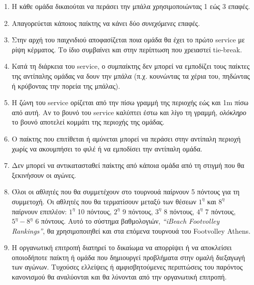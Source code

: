 \documentclass[a4paper,11pt]{article}
\begin{document}
\begin{enumerate}
\item Η κάθε ομάδα δικαιούται να περάσει την μπάλα χρησιμοποιώντας 1 εώς 3
  επαφές.

\item Απαγορεύεται κάποιος παίκτης να κάνει δύο \textit{συνεχόμενες} επαφές.

\item Στην αρχή του παιχνιδιού αποφασίζεται ποια ομάδα θα έχει το πρώτο service
  με ρίψη κέρματος. Το ίδιο συμβαίνει και στην περίπτωση που χρειαστεί
  tie-break.

\item Κατά τη διάρκεια του service, ο συμπαίκτης δεν μπορεί να εμποδίζει τους
  παίκτες της αντίπαλης ομάδας να δουν την μπάλα (π.χ. κουνώντας τα χέρια του,
  πηδώντας ή κρύβοντας την πορεία της μπάλας).

\item Η ζώνη του service ορίζεται από την πίσω γραμμή της περιοχής εώς και 1m
  πίσω από αυτή. Αν το βουνό του service καλύπτει έστω και λίγο τη γραμμή,
  \textit{ολόκληρο} το βουνό αποτελεί κομμάτι της περιοχής της ομάδας.

\item Ο παίκτης που επιτίθεται ή αμύνεται μπορεί να περάσει στην αντίπαλη
  περιοχή χωρίς να ακουμπήσει το φιλέ ή να εμποδίσει την αντίπαλη ομάδα.

\item Δεν μπορεί να αντικατασταθεί παίκτης από κάποια ομάδα από τη στιγμή που θα
  ξεκινήσουν οι αγώνες.

\item Όλοι οι αθλητές που θα συμμετέχουν στο τουρνουά παίρνουν 5 πόντους για τη
  συμμετοχή. Οι αθλητές που θα τερματίσουν μεταξύ των θέσεων $1^{\eta}$ και
  $8^{\eta}$ παίρνουν επιπλέον: $1^{\eta}$ 10 πόντους, $2^{\eta}$ 9 πόντους,
  $3^{\eta}$ 8 πόντους, $4^{\eta}$ 7 πόντους, $5^{\eta}-8^{\eta}$ 6 πόντους.
  Αυτό το σύστημα βαθμολογιών, \textit{``iBeach Footvolley Rankings''}, θα
  χρησιμοποιηθεί και στα επόμενα τουρνουά του Footvolley Athens.

\item Η οργανωτική επιτροπή διατηρεί το δικαίωμα να απορρίψει ή να αποκλείσει
  οποιοδήποτε παίκτη ή ομάδα που δημιουργεί προβλήματα στην ομαλή διεξαγωγή των
  αγώνων. Τυχούσες ελλείψεις ή αμφισβητούμενες περιπτώσεις του παρόντος
  κανονισμού θα αναλύονται και θα λύνονται από την οργανωτική επιτροπή.

\end{enumerate}


\renewcommand{\refname}{}
\end{document}
